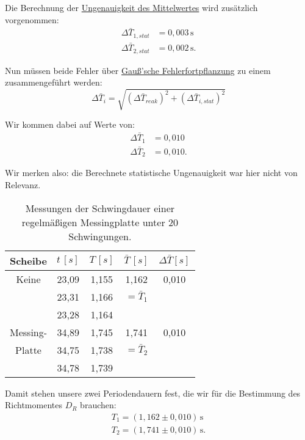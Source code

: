 Die Berechnung der \hyperref[eq:fehler_mittelwert]{Ungenauigkeit des Mittelwertes} wird zusätzlich vorgenommen:
\begin{align}
    \Delta \bar{T}_{1,stat} &= 0,003\,\mathrm{s} \\
    \Delta \bar{T}_{2,stat} &= 0,002\,\mathrm{s}.
\end{align}

Nun müssen beide Fehler über \hyperref[eq:gauss_fehlfortpflanzung]{Gauß'sche Fehlerfortpflanzung} zu einem zusammengeführt werden:
\begin{equation}
\Delta \bar{T}_{i} = \sqrt{(\Delta \bar{T}_{reak})^2 + (\Delta \bar{T}_{i,stat})^2}
\end{equation}

Wir kommen dabei auf Werte von:
\begin{align}
    \Delta \bar{T}_1 &= 0,010 \\
    \Delta \bar{T}_2 &= 0,010.
    \label{eq:t_reak}
\end{align}

Wir merken also: die Berechnete statistische Ungenauigkeit war hier nicht von Relevanz.

\begin{table}[h!]
    \begin{tabular}{c | c | c | c | c}
    Scheibe & $t \, [s]$& $T \, [s]$ & $\bar{T} \, [s]$ & $\Delta \bar{T} [s]$\\
    \hline
    Keine       & 23,09 & 1,155 & 1,162 & 0,010\\
                & 23,31 & 1,166 & $= \bar{T}_1$ & \\
                & 23,28 & 1,164 &  & \\
     \hline
    Messing-    & 34,89 & 1,745 & 1,741 & 0,010\\
    Platte      & 34,75 & 1,738 & $= \bar{T}_2$ & \\
                & 34,78 & 1,739 &  & \\
    \hline
    \end{tabular}
    \caption{Messungen der Schwingdauer einer regelmäßigen Messingplatte unter 20 Schwingungen.}
    \label{tab:regelmäßige_messingplatte}
\end{table}

Damit stehen unsere zwei Periodendauern fest, die wir für die Bestimmung des Richtmomentes $D_R$ brauchen:
\begin{align}
T_1 = (1,162 \pm 0,010)\,\mathrm{s} \\
T_2 = (1,741 \pm 0,010)\,\mathrm{s}.
\end{align}

